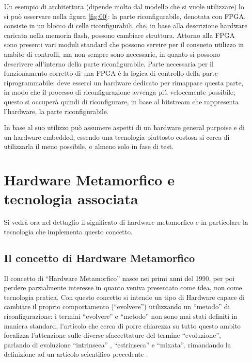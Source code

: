 \documentclass[a4paper,titlepage]{book}
\begin{document}
Un esempio di architettura (dipende molto dal modello che si vuole utilizzare) lo si può osservare nella figura \ref{fig:00}: la parte riconfigurabile, denotata con FPGA, consiste in un blocco di celle riconfigurabili, che, in base alla descrizione hardware caricata nella memoria flash, possono cambiare struttura. Attorno alla FPGA sono presenti vari moduli standard che possono servire per il consueto utilizzo in ambito di controlli, ma non sempre sono necessarie, in quanto si possono descrivere all'interno della parte riconfigurabile. Parte necessaria per il funzionamento corretto di una FPGA è la logica di controllo della parte riprogrammabile: deve esserci un hardware dedicato per rimappare questa parte, in modo che il processo di riconfigurazione avvenga più velocemente possibile; questo si occuperà quindi di riconfigurare, in base al bitstream che rappresenta l'hardware, la parte riconfigurabile.

In base al suo utilizzo può assumere aspetti di un hardware general purpoise e di un hardware embedded; essendo una tecnologia piuttosto costosa si cerca di utilizzarla il meno possibile, o almeno solo in fase di test.

\chapter{Hardware Metamorfico e tecnologia associata}

Si vedrà ora nel dettaglio il significato di hardware metamorfico e in particolare la tecnologia che implementa questo concetto. 

\section{Il concetto di Hardware Metamorfico}

Il concetto di ``Hardware Metamorfico'' nasce nei primi anni del 1990, per poi perdere parzialmente interesse in quanto veniva presentato come idea, non come tecnologia pratica. Con questo concetto si intende un tipo di Hardware capace di cambiare il proprio comportamento (``evolvere'') utilizzando un ``metodo'' di riconfigurazione: i termini ``evolvere'' e ``metodo'' non sono mai stati definiti in maniera standard, l'articolo che cerca di porre chiarezza su tutto questo ambito \cite{MS1} focalizza l'attenzione sulle diverse sfaccettature del termine ``evoluzione'', parlando di evoluzione ``intrinseca'' , ``estrinseca'' e ``mixata'', rimandando la definizione ad un articolo scientifico precedente \cite{EIE}.
\end{document}
